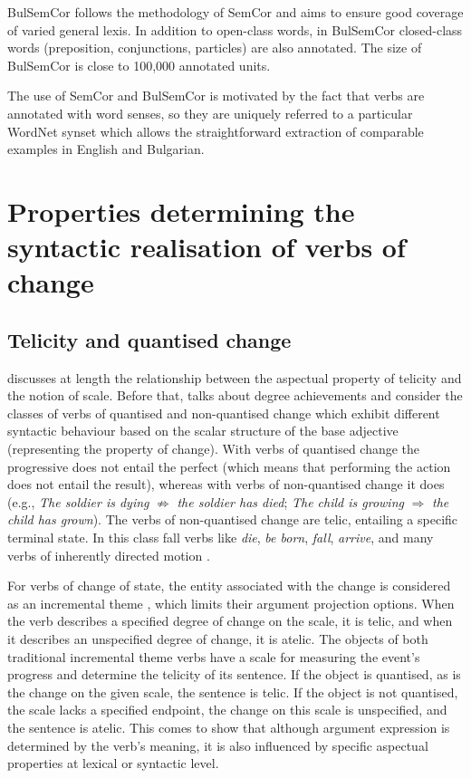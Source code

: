 \documentclass[output=paper,colorlinks,citecolor=brown]{langscibook}
\begin{document}
BulSemCor \citep{koeva-2006-bulsemcor,koeva-2011-bulsemcor,koeva2012bulsemcor} follows the methodology of SemCor and aims to ensure good coverage of varied general lexis. In addition to open-class words, in BulSemCor closed-class words (preposition, conjunctions, particles) are also annotated. The size of BulSemCor is close to 100,000 annotated units.

The use of SemCor and BulSemCor is motivated by the fact that verbs are annotated with word senses, so they are uniquely referred to a particular WordNet synset which allows the straightforward extraction of comparable examples in English and Bulgarian.

\section{Properties determining the syntactic realisation of verbs of change}\label{sec:semproperties}

\subsection{Telicity and quantised change}\label{sec:telicity}

\citet{RappaportHovav2008} discusses at length the relationship between the aspectual property of telicity and the notion of scale. Before that, \citet[88--90]{Dowty1979} talks about degree achievements and \citet{Hay1999} consider the classes of verbs of quantised and non-quantised change which exhibit different syntactic behaviour based on the scalar structure of the base adjective (representing the property of change). With verbs of quantised change the progressive does not entail the perfect (which means that performing the action does not entail the result), whereas with verbs of non-quantised change it does (e.g., \textit{The soldier is dying}  $\nRightarrow$ \textit{the soldier has died}; \textit{The child is growing} $\Rightarrow$ \textit{the child has grown}). The verbs of non-quantised change are telic, entailing a specific terminal state. In this class fall verbs like \textit{die}, \textit{be born}, \textit{fall}, \textit{arrive}, and many verbs of inherently directed motion \citep{Levin1993}.

For verbs of change of state, the entity associated with the change is considered as an incremental theme , which limits their argument projection options.
When the verb describes a specified degree of change on the scale, it is telic, and when it describes an unspecified degree of change, it is atelic. The objects of both traditional incremental theme verbs have a scale for measuring the event's progress and determine the telicity of its sentence. If the object is quantised, as is the change on the given scale, the sentence is telic. If the object is not quantised, the scale lacks a specified endpoint, the change on this scale is unspecified, and the sentence is atelic.
This comes to show that although argument expression is determined by the verb’s meaning, it is also influenced by specific aspectual properties at lexical or syntactic level.
\end{document}
